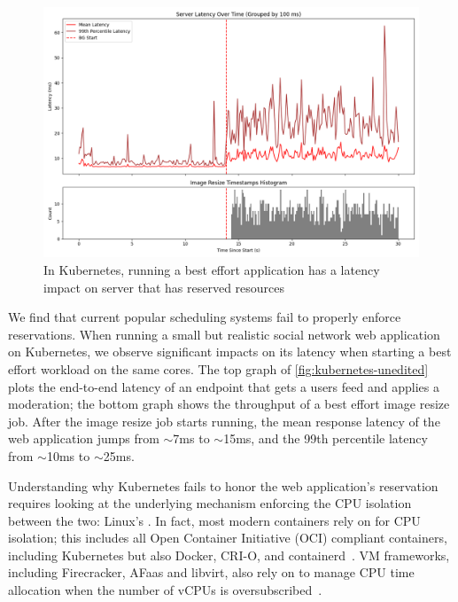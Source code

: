 \begin{figure}[t]
    \centering
    \includegraphics[width=\columnwidth]{graphs/kubernetes-unedited.png}
    \caption{In Kubernetes, running a best effort application has a latency
    impact on server that has reserved resources}\label{fig:kubernetes-unedited}
\end{figure}

We find that current popular scheduling systems fail to properly enforce
reservations. When running a small but realistic social network web application
on Kubernetes, we observe significant impacts on its latency when starting a
best effort workload on the same cores. The top graph of
\autoref{fig:kubernetes-unedited} plots the end-to-end latency of an endpoint
that gets a users feed and applies a moderation; the bottom graph shows the
throughput of a best effort image resize job. After the image resize job starts
running, the mean response latency of the web application jumps from $\sim$7ms
to $\sim$15ms, and the 99th percentile latency from $\sim$10ms to $\sim$25ms.

Understanding why Kubernetes fails to honor the web application's reservation
requires looking at the underlying mechanism enforcing the CPU isolation between
the two: Linux's \cgroups{}. In fact, most modern containers rely on \cgroups{}
for CPU isolation; this includes all Open Container Initiative (OCI) compliant
containers, including Kubernetes but also Docker, CRI-O, and
containerd~\cite{oci-cgroups,docker-docs-cgroups,container-isolation-article}.
VM frameworks, including Firecracker, AFaas and libvirt, also rely on \cgroups{}
to manage CPU time allocation when the number of vCPUs is
oversubscribed~\cite{firecracker-cgroups,afaas,libvirt-cgroups}.

